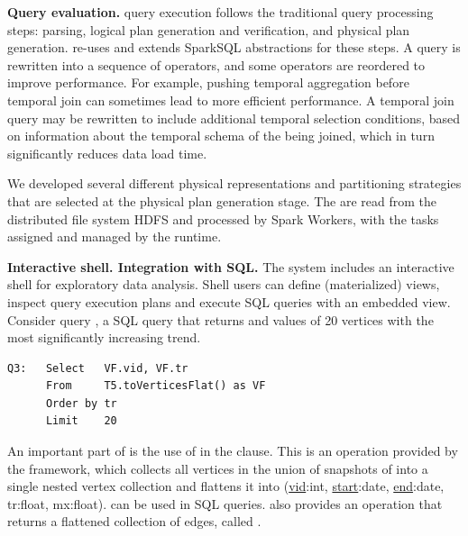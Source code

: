 {\bf Query evaluation.}  \ql query execution follows the traditional
query processing steps: parsing, logical plan generation and
verification, and physical plan generation.  \ql re-uses and extends
SparkSQL abstractions for these steps.  A \ql query is rewritten into
a sequence of operators, and some operators are reordered to improve
performance.  For example, pushing temporal aggregation before
temporal join can sometimes lead to more efficient performance.  A
temporal join query may be rewritten to include additional temporal
selection conditions, based on information about the temporal schema
of the \tgs being joined, which in turn significantly reduces data
load time.

We developed several different physical representations and
partitioning strategies that are selected at the physical plan
generation stage.  The \tgs are read from the distributed file system
HDFS and processed by Spark Workers, with the tasks assigned and
managed by the runtime.

{\bf Interactive shell.  Integration with SQL.} The \ql system
includes an interactive shell for exploratory data analysis.  Shell
users can define (materialized) \tg views, inspect query execution
plans and execute SQL queries with an embedded \ql view.  Consider
query , a SQL query that returns  and 
values of 20 vertices with the most significantly increasing
 trend.


\begin{small}
\begin{verbatim}
Q3:   Select   VF.vid, VF.tr  
      From     T5.toVerticesFlat() as VF
      Order by tr
      Limit    20
\end{verbatim}
\end{small}

An important part of  is the use of
 in the  clause.  This is an
operation provided by the \ql framework, which collects all vertices
in the union of snapshots of  into a single nested vertex
collection and flattens it into  (\underline{vid}:int,
\underline{start}:date, \underline{end}:date, tr:float, mx:float).
 can be used in SQL queries.  \ql also provides an operation
that returns a flattened collection of edges, called
.



